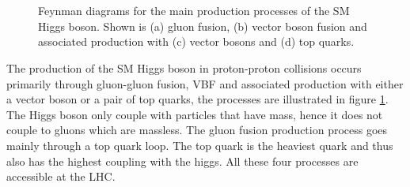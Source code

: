\begin{figure}[!htb]
 \qquad
{} \\
  \qquad
{} \\
\caption[Feynman diagrams for the main production processes of the SM Higgs
boson.]{Feynman diagrams for the main production processes of the \gls{SM} Higgs
boson. Shown is (a) gluon fusion, (b) vector boson fusion and
associated production with (c) vector bosons and (d) top quarks.}
\label{FIGURE:Theory_SM_SearchingSMHiggs_SMFeynmanDiagrams}
\end{figure}

The production of the \gls{SM} Higgs boson in proton-proton collisions occurs primarily through gluon-gluon fusion, \gls{VBF} and associated production with either a vector boson or a pair of top quarks, the processes are illustrated in figure \ref{FIGURE:Theory_SM_SearchingSMHiggs_SMFeynmanDiagrams}. The Higgs boson only couple with particles that have mass, hence it does not couple to gluons which are massless. The gluon fusion production process goes mainly through a top quark loop. The top quark is the heaviest quark and thus also has the highest coupling with the higgs. All these four processes are accessible at the \gls{LHC}.

